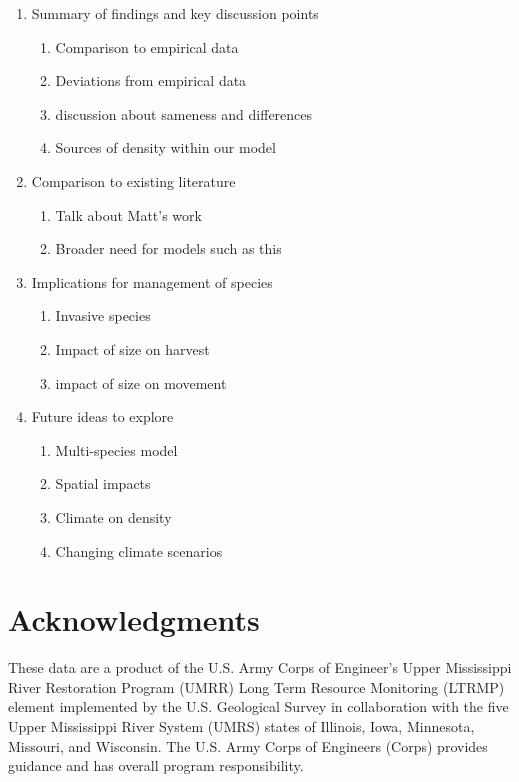 \documentclass[preprint,review,12pt,authoryear]{elsarticle}
\begin{document}
\begin{enumerate}
\item Summary of findings and key discussion points
  \begin{enumerate}
  \item Comparison to empirical data
  \item Deviations from empirical data
  \item discussion about sameness and differences
  \item Sources of density within our model
  \end{enumerate}
\item Comparison to existing literature
  \begin{enumerate}
  \item Talk about Matt's work \citep{catalano2010size,
      catalano2011whole}
  \item Broader need for models such as this
  \end{enumerate}
\item Implications for management of species
  \begin{enumerate}
  \item Invasive species
  \item Impact of size on harvest
  \item impact of size on movement
  \end{enumerate}
\item Future ideas to explore
  \begin{enumerate}
  \item Multi-species model
  \item Spatial impacts
  \item Climate on density
  \item Changing climate scenarios
  \end{enumerate}
\end{enumerate}

\section{Acknowledgments}

These data are a product of the U.S. Army Corps of Engineer's Upper Mississippi 
River Restoration Program (UMRR) Long Term Resource Monitoring (LTRMP) element 
implemented by the U.S. Geological Survey in collaboration with the five 
Upper Mississippi River System (UMRS) states of Illinois, Iowa, Minnesota, 
Missouri, and Wisconsin.
The U.S. Army Corps of Engineers (Corps) 
provides guidance and has overall program responsibility.
\end{document}
